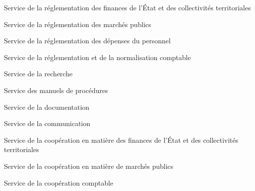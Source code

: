 \documentclass[a4paper,12pt,oneside]{report}
\begin{document}
{\small

\begin{svc}
\item Service de la réglementation des finances de l'État et des collectivités territoriales
\item Service de la réglementation des marchés publics
\item Service de la réglementation des dépenses du personnel
\item Service de la réglementation et de la normalisation comptable
\end{svc}
\begin{svc}
\item Service de la recherche
\item Service des manuels de procédures
\item Service de la documentation
\item Service de la communication
\end{svc}
\begin{svc}
\item Service de la coopération en matière des finances de l'État et des collectivités territoriales
\item Service de la coopération en matière de marchés publics
\item Service de la coopération comptable
\end{svc}

}
\end{document}
